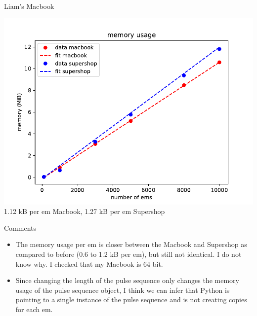 \documentclass[dvipsnames]{beamer}
\begin{document}
\begin{frame}{Liam's Macbook}
\begin{center}
\includegraphics[height=0.8\textheight]{mem_num_ems}
1.12 kB per em Macbook, 1.27 kB per em Supershop
\end{center}
\end{frame}

\begin{frame}{Comments}
\begin{itemize}
\item The memory usage per em is closer between the Macbook and Supershop as compared to before (0.6 to 1.2 kB per em), but still not identical. I do not know why. I checked that my Macbook is 64 bit.
\item Since changing the length of the pulse sequence only changes the memory usage of the pulse sequence object, I think we can infer that Python is pointing to a single instance of the pulse sequence and is not creating copies for each em.
\end{itemize}
\end{frame}
\end{document}
